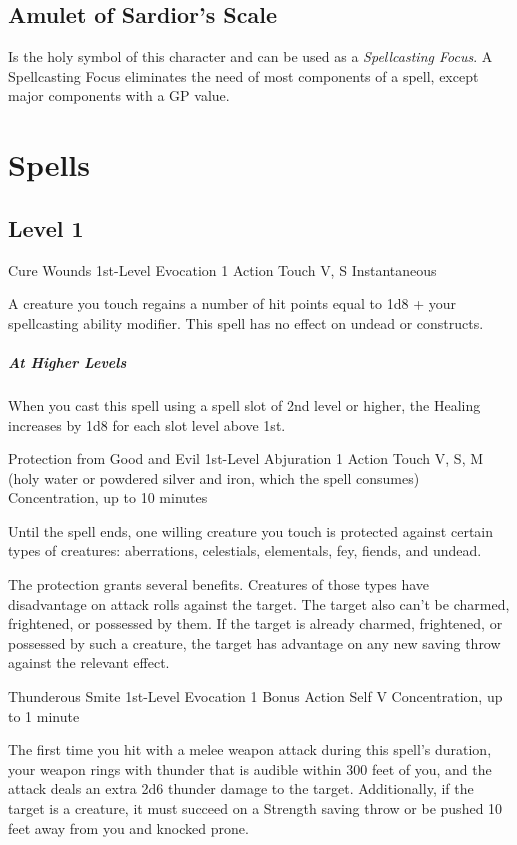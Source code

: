 \documentclass[letterpaper,openany,oneside,twocolumn]{book}
\begin{document}
\subsection*{Amulet of Sardior's Scale}
Is the holy symbol of this character and can be used as a \textit{Spellcasting Focus}. A Spellcasting Focus eliminates the need of most components of a spell, except major components with a GP value.

\section*{Spells}
\subsection*{Level 1}

\DndSpellHeader
  {Cure Wounds}
  {1st-Level Evocation}
  {1 Action}
  {Touch}
  {V, S}
  {Instantaneous}

A creature you touch regains a number of hit points equal to 1d8 + your spellcasting ability modifier. This spell has no effect on undead or constructs.

\subparagraph*{At Higher Levels} When you cast this spell using a spell slot of 2nd level or higher, the Healing increases by 1d8 for each slot level above 1st.

\DndSpellHeader
  {Protection from Good and Evil}
  {1st-Level Abjuration}
  {1 Action}
  {Touch}
  {V, S,  M (holy water or powdered silver and iron, which the spell consumes)}
  {Concentration, up to 10 minutes}

Until the spell ends, one willing creature you touch is protected against certain types of creatures: aberrations, celestials, elementals, fey, fiends, and undead.

The protection grants several benefits. Creatures of those types have disadvantage on attack rolls against the target. The target also can't be charmed, frightened, or possessed by them. If the target is already charmed, frightened, or possessed by such a creature, the target has advantage on any new saving throw against the relevant effect.

\DndSpellHeader
  {Thunderous Smite}
  {1st-Level Evocation}
  {1 Bonus Action}
  {Self}
  {V}
  {Concentration, up to 1 minute}

The first time you hit with a melee weapon attack during this spell's duration, your weapon rings with thunder that is audible within 300 feet of you, and the attack deals an extra 2d6 thunder damage to the target. Additionally, if the target is a creature, it must succeed on a Strength saving throw or be pushed 10 feet away from you and knocked prone.
\end{document}

